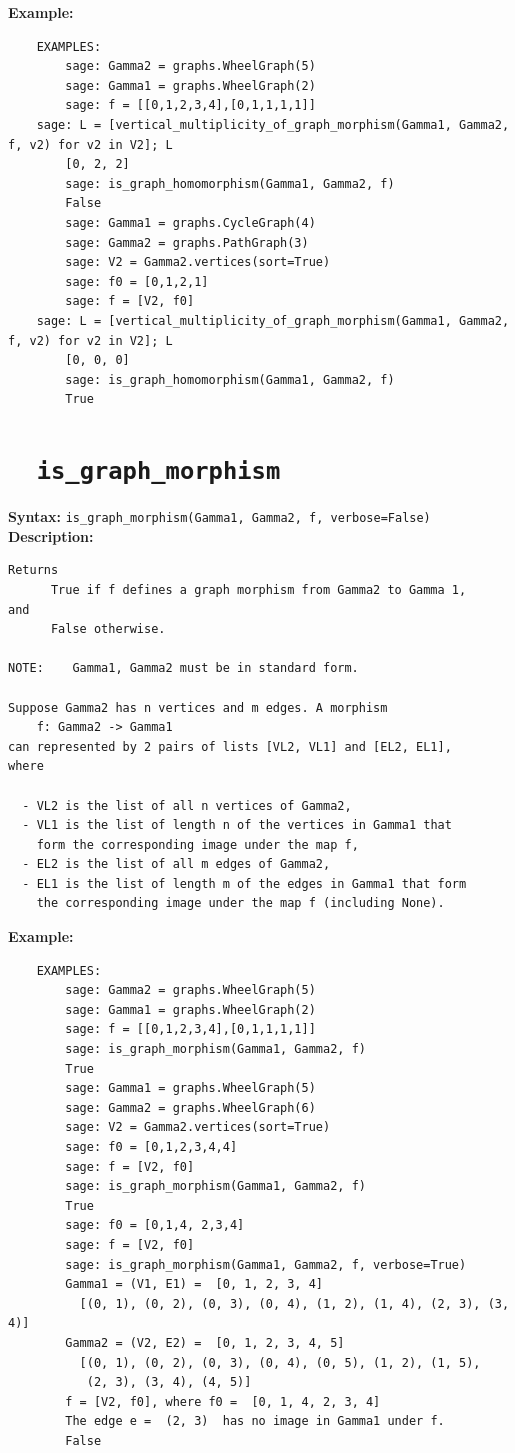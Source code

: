 \documentclass{article}
\begin{document}
\textbf{Example:}
\begin{verbatim}
    EXAMPLES:
        sage: Gamma2 = graphs.WheelGraph(5)
        sage: Gamma1 = graphs.WheelGraph(2)
        sage: f = [[0,1,2,3,4],[0,1,1,1,1]]
	sage: L = [vertical_multiplicity_of_graph_morphism(Gamma1, Gamma2, f, v2) for v2 in V2]; L
        [0, 2, 2]
        sage: is_graph_homomorphism(Gamma1, Gamma2, f)
        False
        sage: Gamma1 = graphs.CycleGraph(4)
        sage: Gamma2 = graphs.PathGraph(3)
        sage: V2 = Gamma2.vertices(sort=True) 
        sage: f0 = [0,1,2,1]  
        sage: f = [V2, f0]
	sage: L = [vertical_multiplicity_of_graph_morphism(Gamma1, Gamma2, f, v2) for v2 in V2]; L
        [0, 0, 0]
        sage: is_graph_homomorphism(Gamma1, Gamma2, f) 
        True
\end{verbatim}

\section{\tt \ \ is\_graph\_morphism}

\textbf{Syntax:} \verb}is_graph_morphism(Gamma1, Gamma2, f, verbose=False)}\\

\textbf{Description:}
\begin{verbatim}
Returns 
      True if f defines a graph morphism from Gamma2 to Gamma 1, 
and 
      False otherwise. 

NOTE:    Gamma1, Gamma2 must be in standard form.

Suppose Gamma2 has n vertices and m edges. A morphism 
    f: Gamma2 -> Gamma1
can represented by 2 pairs of lists [VL2, VL1] and [EL2, EL1],
where 

  - VL2 is the list of all n vertices of Gamma2,
  - VL1 is the list of length n of the vertices in Gamma1 that 
    form the corresponding image under the map f, 
  - EL2 is the list of all m edges of Gamma2,
  - EL1 is the list of length m of the edges in Gamma1 that form 
    the corresponding image under the map f (including None). 
\end{verbatim}

\textbf{Example:}
\begin{verbatim}
    EXAMPLES:
        sage: Gamma2 = graphs.WheelGraph(5)
        sage: Gamma1 = graphs.WheelGraph(2)
        sage: f = [[0,1,2,3,4],[0,1,1,1,1]]
        sage: is_graph_morphism(Gamma1, Gamma2, f)
        True
        sage: Gamma1 = graphs.WheelGraph(5)
        sage: Gamma2 = graphs.WheelGraph(6)
        sage: V2 = Gamma2.vertices(sort=True) 
        sage: f0 = [0,1,2,3,4,4]  
        sage: f = [V2, f0]   
        sage: is_graph_morphism(Gamma1, Gamma2, f) 
        True
        sage: f0 = [0,1,4, 2,3,4] 
        sage: f = [V2, f0]   
        sage: is_graph_morphism(Gamma1, Gamma2, f, verbose=True) 
        Gamma1 = (V1, E1) =  [0, 1, 2, 3, 4]
          [(0, 1), (0, 2), (0, 3), (0, 4), (1, 2), (1, 4), (2, 3), (3, 4)]
        Gamma2 = (V2, E2) =  [0, 1, 2, 3, 4, 5]
          [(0, 1), (0, 2), (0, 3), (0, 4), (0, 5), (1, 2), (1, 5),
           (2, 3), (3, 4), (4, 5)]
        f = [V2, f0], where f0 =  [0, 1, 4, 2, 3, 4]
        The edge e =  (2, 3)  has no image in Gamma1 under f.
        False
\end{verbatim}
\end{document}
